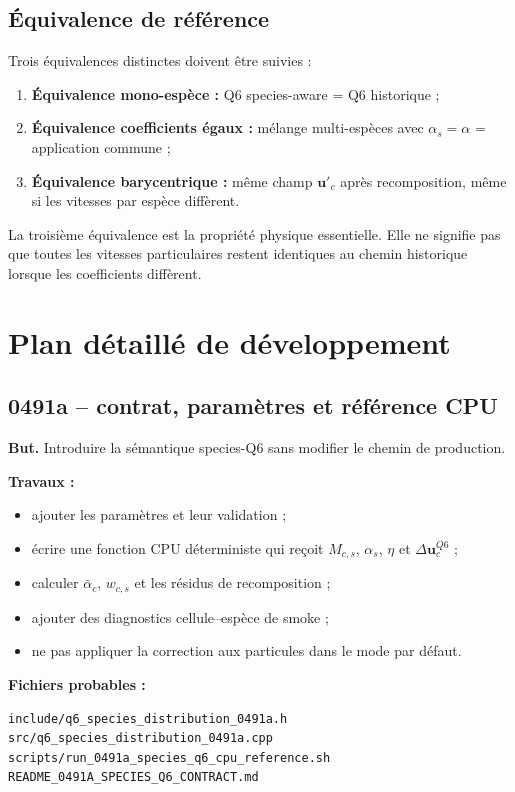 \documentclass[11pt,a4paper]{article}
\newcommand{\vect}[1]{\bm{#1}}
\begin{document}
\subsection{Équivalence de référence}

Trois équivalences distinctes doivent être suivies :
\begin{enumerate}
  \item \textbf{Équivalence mono-espèce :} Q6 species-aware = Q6 historique ;
  \item \textbf{Équivalence coefficients égaux :} mélange multi-espèces avec \(\alpha_s=\alpha\) = application commune ;
  \item \textbf{Équivalence barycentrique :} même champ \(\vect u'_c\) après recomposition, même si les vitesses par espèce diffèrent.
\end{enumerate}

La troisième équivalence est la propriété physique essentielle. Elle ne signifie pas que toutes les vitesses particulaires restent identiques au chemin historique lorsque les coefficients diffèrent.

\section{Plan détaillé de développement}

\subsection{0491a -- contrat, paramètres et référence CPU}

\textbf{But.} Introduire la sémantique species-Q6 sans modifier le chemin de production.

\textbf{Travaux :}
\begin{itemize}
  \item ajouter les paramètres et leur validation ;
  \item écrire une fonction CPU déterministe qui reçoit \(M_{c,s}\), \(\alpha_s\), \(\eta\) et \(\Delta\vect u_c^{Q6}\) ;
  \item calculer \(\bar\alpha_c\), \(w_{c,s}\) et les résidus de recomposition ;
  \item ajouter des diagnostics cellule--espèce de smoke ;
  \item ne pas appliquer la correction aux particules dans le mode par défaut.
\end{itemize}

\textbf{Fichiers probables :}
\begin{lstlisting}
include/q6_species_distribution_0491a.h
src/q6_species_distribution_0491a.cpp
scripts/run_0491a_species_q6_cpu_reference.sh
README_0491A_SPECIES_Q6_CONTRACT.md
\end{lstlisting}
\end{document}
